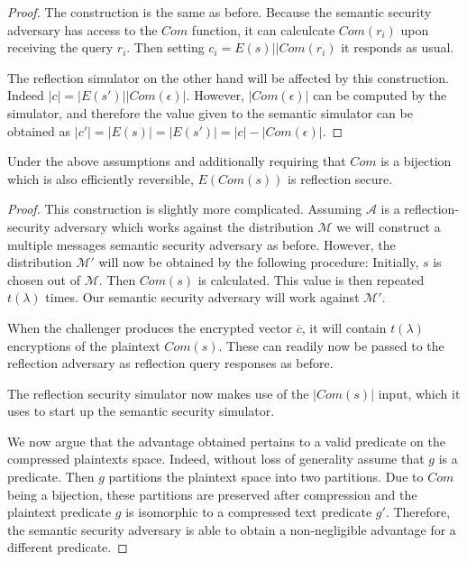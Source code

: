 \begin{proof}
    The construction is the same as before. Because the semantic security
    adversary has access to the $Com$ function, it can calculcate $Com(r_i)$
    upon receiving the query $r_i$. Then setting $c_i = E(s) || Com(r_i)$ it
    responds as usual.

    The reflection simulator on the other hand will be affected by this
    construction. Indeed $|c| = |E(s') || Com(\epsilon)|$. However,
    $|Com(\epsilon)|$ can be computed by the simulator, and therefore the value
    given to the semantic simulator can be obtained as $|c'| = |E(s)| = |E(s')|
    = |c| - |Com(\epsilon)|$.
\end{proof}

\begin{lemma}
    Under the above assumptions and additionally requiring that $Com$ is a
    bijection which is also efficiently reversible, $E(Com(s))$ is reflection secure.
\end{lemma}

\begin{proof}
    This construction is slightly more complicated. Assuming $\mathcal{A}$ is a
    reflection-security adversary which works against the distribution
    $\mathcal{M}$ we will construct a multiple messages semantic security
    adversary as before. However, the distribution $\mathcal{M'}$ will now be
    obtained by the following procedure: Initially, $s$ is chosen out of
    $\mathcal{M}$. Then $Com(s)$ is calculated. This value is then repeated
    $t(\lambda)$ times. Our semantic security adversary will work against
    $\mathcal{M'}$.

    When the challenger produces the encrypted vector $\overbar{c}$, it will
    contain $t(\lambda)$ encryptions of the plaintext $Com(s)$. These can
    readily now be passed to the reflection adversary as reflection query
    responses as before.

    The reflection security simulator now makes use of the $|Com(s)|$ input,
    which it uses to start up the semantic security simulator.

    We now argue that the advantage obtained pertains to a valid predicate on
    the compressed plaintexts space. Indeed, without loss of generality assume
    that $g$ is a predicate. Then $g$ partitions the plaintext space into two
    partitions. Due to $Com$ being a bijection, these partitions are preserved
    after compression and the plaintext predicate $g$ is isomorphic to a
    compressed text predicate $g'$. Therefore, the semantic security adversary
    is able to obtain a non-negligible advantage for a different predicate.
\end{proof}

